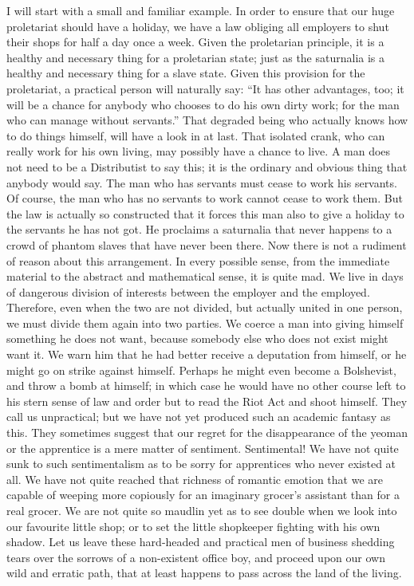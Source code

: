\documentclass{book}
\begin{document}
I will start with a small and familiar example. In order to ensure that our huge proletariat should have a holiday, we have a law obliging all employers to shut their shops for half a day once a week. Given the proletarian principle, it is a healthy and necessary thing for a proletarian state; just as the saturnalia is a healthy and necessary thing for a slave state. Given this provision for the proletariat, a practical person will naturally say: “It has other advantages, too; it will be a chance for anybody who chooses to do his own dirty work; for the man who can manage without servants.” That degraded being who actually knows how to do things himself, will have a look in at last. That isolated crank, who can really work for his own living, may possibly have a chance to live. A man does not need to be a Distributist to say this; it is the ordinary and obvious thing that anybody would say. The man who has servants must cease to work his servants. Of course, the man who has no servants to work cannot cease to work them. But the law is actually so constructed that it forces this man also to give a holiday to the servants he has not got. He proclaims a saturnalia that never happens to a crowd of phantom slaves that have never been there. Now there is not a rudiment of reason about this arrangement. In every possible sense, from the immediate material to the abstract and mathematical sense, it is quite mad. We live in days of dangerous division of interests between the employer and the employed. Therefore, even when the two are not divided, but actually united in one person, we must divide them again into two parties. We coerce a man into giving himself something he does not want, because somebody else who does not exist might want it. We warn him that he had better receive a deputation from himself, or he might go on strike against himself. Perhaps he might even become a Bolshevist, and throw a bomb at himself; in which case he would have no other course left to his stern sense of law and order but to read the Riot Act and shoot himself. They call us unpractical; but we have not yet produced such an academic fantasy as this. They sometimes suggest that our regret for the disappearance of the yeoman or the apprentice is a mere matter of sentiment. Sentimental! We have not quite sunk to such sentimentalism as to be sorry for apprentices who never existed at all. We have not quite reached that richness of romantic emotion that we are capable of weeping more copiously for an imaginary grocer’s assistant than for a real grocer. We are not quite so maudlin yet as to see double when we look into our favourite little shop; or to set the little shopkeeper fighting with his own shadow. Let us leave these hard-headed and practical men of business shedding tears over the sorrows of a non-existent office boy, and proceed upon our own wild and erratic path, that at least happens to pass across the land of the living.
\end{document}
